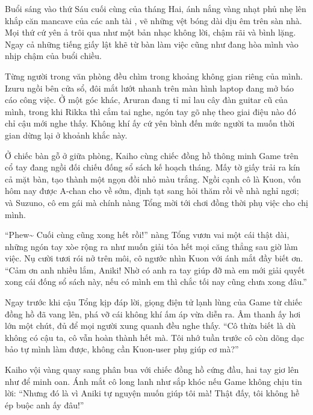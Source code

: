 \documentclass[../main.tex]{subfiles}
\begin{document}

Buổi sáng vào thứ Sáu cuối cùng của tháng Hai, ánh nắng vàng nhạt phủ nhẹ lên khắp căn mancave của các anh tài \hls, vẽ những vệt bóng dài dịu êm trên sàn nhà. Mọi thứ cứ yên ả trôi qua như một bản nhạc không lời, chậm rãi và bình lặng. Ngay cả những tiếng giấy lật khẽ từ bàn làm việc cũng như đang hòa mình vào nhịp chậm của buổi chiều.

Từng người trong văn phòng đều chìm trong khoảng không gian riêng của mình. Izuru ngồi bên cửa sổ, đôi mắt lướt nhanh trên màn hình laptop đang mở báo cáo công việc. Ở một góc khác, Aruran đang tỉ mỉ lau cây đàn guitar cũ của mình, trong khi Rikka thì cắm tai nghe, ngón tay gõ nhẹ theo giai điệu nào đó chỉ cậu mới nghe thấy. Không khí ấy cứ yên bình đến mức người ta muốn thời gian dừng lại ở khoảnh khắc này.

Ở chiếc bàn gỗ ở giữa phòng, Kaiho cùng chiếc đồng hồ thông minh Game trên cổ tay đang ngồi đối chiếu đống sổ sách kế hoạch tháng. Mấy tờ giấy trải ra kín cả mặt bàn, tạo thành một ngọn đồi nhỏ màu trắng. Ngồi cạnh cô là Kuon, vốn hôm nay được A-chan cho về sớm, định tạt sang hỏi thăm rồi về nhà nghỉ ngơi; và Suzuno, cô em gái mà chính nàng Tổng mời tới chơi đồng thời phụ việc cho chị mình.

``Phew\~{} Cuối cùng cũng xong hết rồi!'' nàng Tổng vươn vai một cái thật dài, những ngón tay xòe rộng ra như muốn giải tỏa hết mọi căng thẳng sau giờ làm việc. Nụ cười tươi rói nở trên môi, cô ngước nhìn Kuon với ánh mắt đầy biết ơn. ``Cảm ơn anh nhiều lắm, Aniki! Nhờ có anh ra tay giúp đỡ mà em mới giải quyết xong cái đống sổ sách này, nếu có mình em thì chắc tối nay cũng chưa xong đâu.''

Ngay trước khi cậu Tổng kịp đáp lời, giọng điện tử lạnh lùng của Game từ chiếc đồng hồ đã vang lên, phá vỡ cái không khí ấm áp vừa diễn ra. Âm thanh ấy hơi lớn một chút, đủ để mọi người xung quanh đều nghe thấy. ``Cô thừa biết là dù không có cậu ta, cô vẫn hoàn thành hết mà. Tôi nhớ tuần trước cô còn dõng dạc bảo tự mình làm được, không cần Kuon-user phụ giúp cơ mà?''

Kaiho vội vàng quay sang phân bua với chiếc đồng hồ cứng đầu, hai tay giơ lên như để minh oan. Ánh mắt cô long lanh như sắp khóc nếu Game không chịu tin lời: ``Nhưng đó là vì Aniki tự nguyện muốn giúp tôi mà! Thật đấy, tôi không hề ép buộc anh ấy đâu!''
\end{document}
